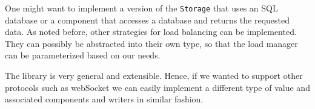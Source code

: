One might want to implement a version of the \texttt{Storage}
that uses an SQL database or a component that accesses a database and 
returns the requested data. As noted before, other strategies 
for load balancing can be implemented.
They can possibly be abstracted into their own type, so that the
load manager can be parameterized based on our needs.  

The library is very general and extensible. Hence, if we wanted to support 
other protocols such as webSocket we can easily implement a different 
type of value and associated components and writers in similar fashion.


